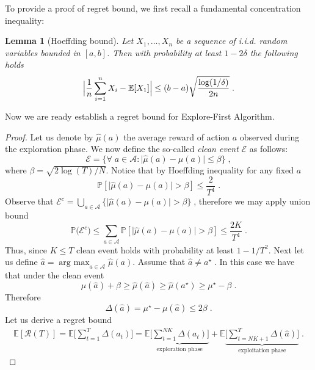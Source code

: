 \documentclass{article}
\numberwithin{equation}{section}
\newtheorem{lemma}{Lemma}
\newcommand{\E}{\mathbb E}
\newcommand{\cA}{\mathcal{A}}
\newcommand{\cE}{\mathcal{E}}
\newcommand{\eqsp}{\;}
\DeclareMathOperator*{\argmax}{arg\ max}
\begin{document}
To provide a proof of regret bound, we first recall a fundamental concentration inequality:
\begin{lemma}[Hoeffding bound]
    Let $X_1,\ldots,X_n$ be a sequence of i.i.d. random variables bounded in $[a,b]$. Then with probability at least $1-2\delta$ the following holds
    \[
        \Bigl\vert  \frac{1}{n} \sum_{i=1}^n X_i - \E[X_1] \Bigr\vert \leq (b-a)\sqrt{\frac{\log(1/\delta)}{2n}}\eqsp.
    \]
\end{lemma}
Now we are ready establish a regret bound for Explore-First Algorithm.
\begin{proof}
    Let us denote by $\widehat{\mu}(a)$ the average reward of action $a$ observed during the exploration phase. We now define the so-called \textit{clean event} $\cE$ as follows:
    \[
        \cE = \{ \forall\eqsp a \in \cA: \vert \widehat{\mu}(a) - \mu(a) \vert \leq \beta \}\eqsp,
    \]
    where $\beta  = \sqrt{2\log(T)/N}$. Notice that by Hoeffding inequality for any fixed $a$
    \[
        \mathbb{P}[\vert \widehat{\mu}(a) - \mu(a) \vert > \beta] \leq \frac{2}{T^4}\eqsp.
    \]
    Observe that ${\cE^c} = \bigcup_{a \in \cA} \{\vert \widehat{\mu}(a) - \mu(a) \vert > \beta\}\eqsp$, therefore we may apply union bound
    \begin{equation}\label{eq:clean_event_explore_first}
        \mathbb{P}\big({\cE^c}\big) \leq \sum_{a \in \cA} \mathbb{P}[\vert \widehat{\mu}(a) - \mu(a) \vert > \beta] \leq \frac{2K}{T^4}\eqsp.
    \end{equation}
    Thus, since $K \leq T$ clean event holds with probability at least $1-1/T^2$. Next let us define $\hat a = \argmax_{a \in \cA} \widehat{\mu}(a)$\eqsp. Assume that $\hat a \not = a^\star\eqsp$. In this case we have that under the clean event
    \[
        \mu(\hat a) + \beta \geq \widehat{\mu}(\hat a) \geq  \widehat{\mu}(a^\star) \geq \mu^\star - \beta\eqsp.
    \]
    Therefore
    \begin{equation}\label{eq:gap_bound_explore_first}
        \Delta(\hat a) = \mu^\star - \mu(\hat a) \leq 2\beta\eqsp.
    \end{equation}
    Let us derive a regret bound
    \begin{align*}
\E[\mathcal{R}(T)] = \E\big[ \textstyle\sum_{t=1}^{T} \Delta(a_t) \big] = \E\!\underbrace{\big[ \textstyle\sum_{t=1}^{NK} \Delta(a_t) \big]}_{\text{exploration phase}}
   + \E\!\underbrace{\big[ \textstyle\sum_{t=NK+1}^{T} \Delta(\hat{a}) \big]}_{\text{exploitation phase}}
   \eqsp.
\end{align*}


\end{proof}
\end{document}
